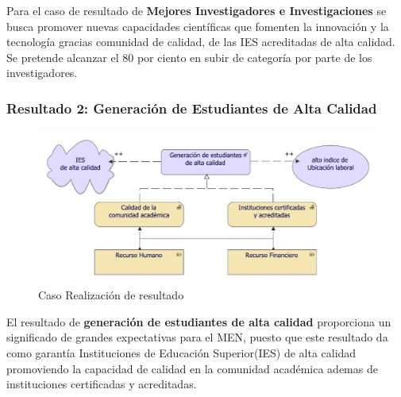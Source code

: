 Para el caso de resultado de \textbf{Mejores Investigadores e Investigaciones} se busca promover nuevas capacidades científicas que fomenten la innovación y la tecnología gracias comunidad de calidad, de las IES acreditadas de alta calidad. Se pretende alcanzar el 80 por ciento en subir de categoría por parte de los investigadores.


\clearpage
\subsubsection{Resultado 2: Generación de Estudiantes de Alta Calidad}

\begin{figure}[h!]
	\centering
	\includegraphics[width=.8\linewidth]{imgs/modelo/estrategia/resultado/resultado.pdf}
	\caption{Caso Realización de resultado}
\end{figure}

El resultado de \textbf{generación de estudiantes de alta calidad} proporciona un significado de grandes expectativas para el MEN, puesto que este resultado da como garantía Instituciones de Educación Superior(IES) de alta calidad promoviendo la capacidad de calidad en la comunidad académica ademas de instituciones certificadas y acreditadas.